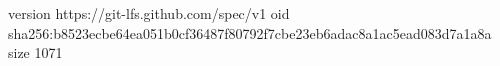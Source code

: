 version https://git-lfs.github.com/spec/v1
oid sha256:b8523ecbe64ea051b0cf36487f80792f7cbe23eb6adac8a1ac5ead083d7a1a8a
size 1071
